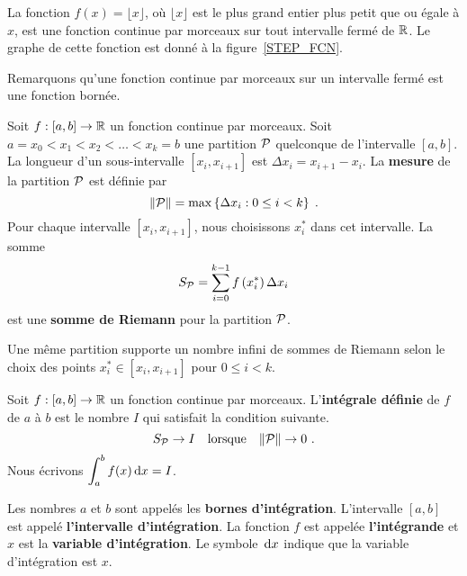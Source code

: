 {\begin{egg}
La fonction $f(x) = \lfloor x \rfloor$, où $\lfloor x \rfloor$ est le
plus grand entier plus petit que ou égale à $x$, est une fonction
continue par morceaux sur tout intervalle fermé de $\mathbb{R}$.  Le graphe
de cette fonction est donné à la figure~\ref{STEP_FCN}.
\end{egg}


Remarquons qu'une fonction continue par morceaux sur un intervalle
fermé est une fonction bornée.

\begin{focus}{\dfn} 
Soit $f:[a,b]\rightarrow \mathbb{R}$ un fonction continue par morceaux.  Soit
$a=x_0 < x_1 < x_2 < \ldots < x_k = b$ une partition ${\cal P}$
quelconque de l'intervalle $[a,b]$.  La longueur d'un sous-intervalle
$[x_i,x_{i+1}]$ est $\Delta x_i = x_{i+1}-x_i$.
La {\bfseries mesure} de la partition $\cal P$ est définie par
\[
\| {\cal P} \| = \max \left\{ \Delta x_i : 0\leq i < k \right\} \; .
\]
Pour chaque intervalle $[x_i,x_{i+1}]$, nous choisissons $x_i^\ast$ dans cet
intervalle.  La somme
\[
S_{\cal P} = \sum_{i=0}^{k-1} f\left(x_i^\ast\right) \Delta x_i
\]
est une {\bfseries somme de Riemann} pour la partition ${\cal P}$.
\end{focus}

Une même partition supporte un nombre infini de sommes de Riemann
selon le choix des points $x_i^\ast \in [x_i, x_{i+1}]$ pour
$0\leq i <k$.

\begin{focus}{\dfn} \label{def_non_rig}
Soit $f:[a,b]\rightarrow \mathbb{R}$ un fonction continue par morceaux.
L'{\bfseries intégrale définie} de $f$ de $a$
à $b$ est le nombre $I$ qui satisfait la condition suivante.
\[
S_{\cal P} \rightarrow I \quad \text{lorsque}
\quad \|{\cal P}\|\rightarrow 0 \ .
\]
Nous écrivons $\displaystyle \displaystyle \int_a^b f(x) \,\mathrm{d}x = I$.

Les nombres $a$ et $b$ sont appelés les
{\bfseries bornes d'intégration}.
L'intervalle $[a,b]$ est appelé
{\bfseries l'intervalle d'intégration}. 
La fonction $f$ est appelée {\bfseries l'intégrande}
et $x$ est la
{\bfseries variable d'intégration}.  Le
symbole $\,\mathrm{d}x$ indique que la variable d'intégration est $x$.
\end{focus}

}
